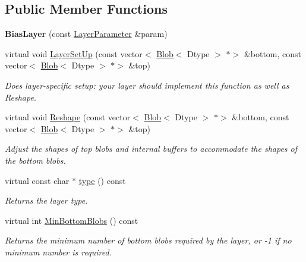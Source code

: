 \subsection*{Public Member Functions}
\begin{DoxyCompactItemize}
\item 
\mbox{\label{classcaffe_1_1_bias_layer_a12e9da7fe06423dd2aaa0d1aba1ae460}} 
{\bfseries Bias\+Layer} (const \mbox{\hyperlink{classcaffe_1_1_layer_parameter}{Layer\+Parameter}} \&param)
\item 
virtual void \mbox{\hyperlink{classcaffe_1_1_bias_layer_aa62a9554bf4fc3eb4db124da0d89fd85}{Layer\+Set\+Up}} (const vector$<$ \mbox{\hyperlink{classcaffe_1_1_blob}{Blob}}$<$ Dtype $>$ $\ast$$>$ \&bottom, const vector$<$ \mbox{\hyperlink{classcaffe_1_1_blob}{Blob}}$<$ Dtype $>$ $\ast$$>$ \&top)
\begin{DoxyCompactList}\small\item\em Does layer-\/specific setup\+: your layer should implement this function as well as Reshape. \end{DoxyCompactList}\item 
virtual void \mbox{\hyperlink{classcaffe_1_1_bias_layer_aff9bd5f76055189c5ec66f43faf17660}{Reshape}} (const vector$<$ \mbox{\hyperlink{classcaffe_1_1_blob}{Blob}}$<$ Dtype $>$ $\ast$$>$ \&bottom, const vector$<$ \mbox{\hyperlink{classcaffe_1_1_blob}{Blob}}$<$ Dtype $>$ $\ast$$>$ \&top)
\begin{DoxyCompactList}\small\item\em Adjust the shapes of top blobs and internal buffers to accommodate the shapes of the bottom blobs. \end{DoxyCompactList}\item 
\mbox{\label{classcaffe_1_1_bias_layer_a5d2e82265dde2cda44e30c052babef9b}} 
virtual const char $\ast$ \mbox{\hyperlink{classcaffe_1_1_bias_layer_a5d2e82265dde2cda44e30c052babef9b}{type}} () const
\begin{DoxyCompactList}\small\item\em Returns the layer type. \end{DoxyCompactList}\item 
virtual int \mbox{\hyperlink{classcaffe_1_1_bias_layer_ab75a2e05bbb1eb37bed5995288143f67}{Min\+Bottom\+Blobs}} () const
\begin{DoxyCompactList}\small\item\em Returns the minimum number of bottom blobs required by the layer, or -\/1 if no minimum number is required. \end{DoxyCompactList}\item 

\end{DoxyCompactItemize}
